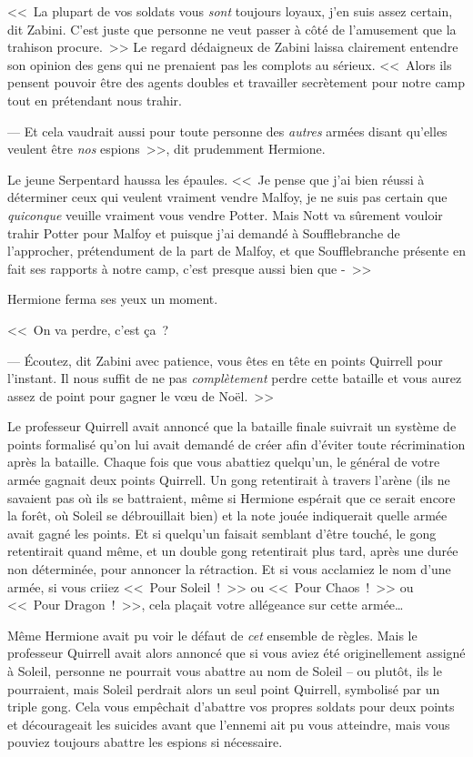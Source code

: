 <<~La plupart de vos soldats vous \emph{sont} toujours loyaux, j'en suis assez certain, dit Zabini. C'est juste que personne ne veut passer à côté de l'amusement que la trahison procure.~>> Le regard dédaigneux de Zabini laissa clairement entendre son opinion des gens qui ne prenaient pas les complots au sérieux. <<~Alors ils pensent pouvoir être des agents doubles et travailler secrètement pour notre camp tout en prétendant nous trahir.

--- Et cela vaudrait aussi pour toute personne des \emph{autres} armées disant qu'elles veulent être \emph{nos} espions~>>, dit prudemment Hermione.

Le jeune Serpentard haussa les épaules. <<~Je pense que j'ai bien réussi à déterminer ceux qui veulent vraiment vendre Malfoy, je ne suis pas certain que \emph{quiconque} veuille vraiment vous vendre Potter. Mais Nott va sûrement vouloir trahir Potter pour Malfoy et puisque j'ai demandé à Soufflebranche de l'approcher, prétendument de la part de Malfoy, et que Soufflebranche présente en fait ses rapports à notre camp, c'est presque aussi bien que -~>>

Hermione ferma ses yeux un moment.

<<~On va perdre, c'est ça~?

--- Écoutez, dit Zabini avec patience, vous êtes en tête en points Quirrell pour l'instant. Il nous suffit de ne pas \emph{complètement} perdre cette bataille et vous aurez assez de point pour gagner le vœu de Noël.~>>

Le professeur Quirrell avait annoncé que la bataille finale suivrait un système de points formalisé qu'on lui avait demandé de créer afin d'éviter toute récrimination après la bataille. Chaque fois que vous abattiez quelqu'un, le général de votre armée gagnait deux points Quirrell. Un gong retentirait à travers l'arène (ils ne savaient pas où ils se battraient, même si Hermione espérait que ce serait encore la forêt, où Soleil se débrouillait bien) et la note jouée indiquerait quelle armée avait gagné les points. Et si quelqu'un faisait semblant d'être touché, le gong retentirait quand même, et un double gong retentirait plus tard, après une durée non déterminée, pour annoncer la rétraction. Et si vous acclamiez le nom d'une armée, si vous criiez <<~Pour Soleil~!~>> ou <<~Pour Chaos~!~>> ou <<~Pour Dragon~!~>>, cela plaçait votre allégeance sur cette armée…

Même Hermione avait pu voir le défaut de \emph{cet} ensemble de règles. Mais le professeur Quirrell avait alors annoncé que si vous aviez été originellement assigné à Soleil, personne ne pourrait vous abattre au nom de Soleil -- ou plutôt, ils le pourraient, mais Soleil perdrait alors un seul point Quirrell, symbolisé par un triple gong. Cela vous empêchait d'abattre vos propres soldats pour deux points et décourageait les suicides avant que l'ennemi ait pu vous atteindre, mais vous pouviez toujours abattre les espions si nécessaire.

